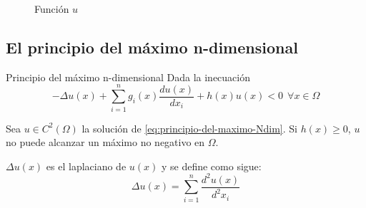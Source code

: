 \begin{figure}[ht]
\centering
\begin{subfigure}{.5\textwidth}
	\centering
	\caption{}
	\label{fig:sol-contraejemplo-pm1}
\end{subfigure}%
\begin{subfigure}{.5\textwidth}
	\centering
	\caption{}
	\label{fig:sol-contraejemplo-pm2}
\end{subfigure}%

\caption{Función $u$}
\label{fig:sol-contraejemplo-pm}
\end{figure}

\newpage
\subsection{El principio del máximo n-dimensional}
\begin{mathresult}{Principio del máximo n-dimensional}
Dada la inecuación
\begin{equation}\label{eq:principio-del-maximo-Ndim}
-\Delta u(x) + \sum_{i=1}^n g_i(x)\frac{du(x)}{dx_i}+h(x)u(x) < 0 \ \ \forall x\in\Omega
\end{equation}

Sea $u\in C^2(\Omega)$ la solución de \eqref{eq:principio-del-maximo-Ndim}.
Si $h(x) \ge 0$, $u$ no puede alcanzar un máximo no negativo en $\Omega$.
\end{mathresult}
\see $\Delta u(x)$ es el laplaciano de $u(x)$ y se define como sigue:
$$\Delta u(x) = \sum_{i=1}^n\frac{d^2u(x)}{d^2x_i}$$

